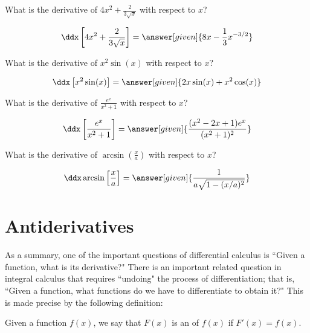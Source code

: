 \documentclass[nooutcomes]{ximera}
\begin{document}
\begin{question} 
  What is the derivative of $4x^2 +\frac{2}{3\sqrt{x}} $ with respect to $x$?
  \begin{prompt} 
    \[
    \ddx  \left[4x^2 +\frac{2}{3\sqrt{x}}  \right] = \answer[given]{8x -\frac{1}{3} x^{-3/2}}
    \]
  \end{prompt}
\end{question}

 
\begin{question} 
  What is the derivative of $x^2 \sin(x) $ with respect to $x$?
  \begin{prompt} 
    \[
    \ddx \left[x^2 \sin(x)\right]= \answer[given]{2x \sin(x) +x^2 \cos(x)}
    \]
  \end{prompt}
\end{question}

\begin{question} 
  What is the derivative of $\frac{e^x}{x^2+1}$ with respect to $x$?
  \begin{prompt} 
    \[
    \ddx \left[\frac{e^x}{x^2+1} \right] = \answer[given]{\frac{( x^2 - 2x +1)e^x}{(x^2+1)^2}}
    \]
  \end{prompt}
\end{question}\begin{question} 
  What is the derivative of $\arcsin\left(\frac{x}{a}\right)$ with respect to $x$?
  \begin{prompt} 
    \[
    \ddx \arcsin\left[\frac{x}{a}\right] = \answer[given]{\frac{1}{a \sqrt{1-(x/a)^2}}}
    \]
  \end{prompt}
\end{question}





\section{Antiderivatives}


As a summary, one of the important questions of differential calculus is ``Given a function, what is its derivative?"  There is an important related question in integral calculus that requires ``undoing" the process of differentiation; that is, ``Given a function, what functions do we have to differentiate to obtain it?"   This is made precise by the following definition:

\begin{definition}  
Given a function $f(x)$, we say that $F(x)$ is an  of $f(x)$ if $F'(x) = f(x)$.
\end{definition}
\end{document}
